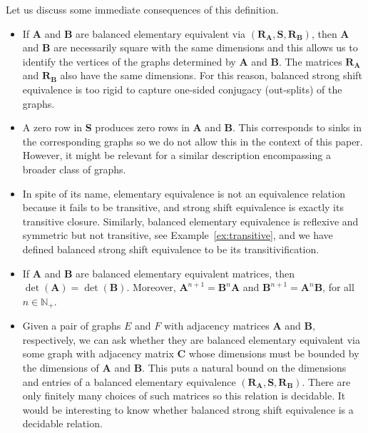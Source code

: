 \documentclass[12pt,a4paper,oneside,reqno,final]{amsart}
\newcommand{\N}{\mathbb{N}}
\theoremstyle{definition}
\numberwithin{equation}{section} %
\begin{document}
Let us discuss some immediate consequences of this definition.
\begin{itemize}
    \item If \textbf{A} and \textbf{B} are balanced elementary equivalent via $(\textbf{R}_\textbf{A}, \textbf{S}, \textbf{R}_\textbf{B})$,
        then \textbf{A} and \textbf{B} are necessarily square with the same dimensions and this allows us to identify the vertices of the graphs determined by \textbf{A} and \textbf{B}.
        The matrices $\textbf{R}_\textbf{A}$ and $\textbf{R}_\textbf{B}$ also have the same dimensions.
        For this reason, balanced strong shift equivalence is too rigid to capture one-sided conjugacy (out-splits) of the graphs.
    \item A zero row in \textbf{S} produces zero rows in \textbf{A} and \textbf{B}. 
        This corresponds to sinks in the corresponding graphs so we do not allow this in the context of this paper.
        However, it might be relevant for a similar description encompassing a broader class of graphs.
    \item In spite of its name, elementary equivalence is not an equivalence relation because it fails to be transitive, and strong shift equivalence is exactly its transitive closure.
        Similarly, balanced elementary equivalence is reflexive and symmetric but not transitive, see Example~\ref{ex:transitive},
        and we have defined balanced strong shift equivalence to be its transitivification.
    \item If \textbf{A} and \textbf{B} are balanced elementary equivalent matrices, then $\det(\textbf{A}) = \det(\textbf{B})$.
        Moreover, $\textbf{A}^{n+1} = \textbf{B}^n \textbf{A}$ and $\textbf{B}^{n+1} = \textbf{A}^n \textbf{B}$, for all $n\in \N_+$.
    \item Given a pair of graphs $E$ and $F$ with adjacency matrices \textbf{A} and \textbf{B}, respectively, we can ask whether they are balanced elementary equivalent
        via some graph with adjacency matrix \textbf{C} whose dimensions must be bounded by the dimensions of \textbf{A} and \textbf{B}.
        This puts a natural bound on the dimensions and entries of a balanced elementary equivalence $(\textbf{R}_\textbf{A}, \textbf{S}, \textbf{R}_\textbf{B})$.
        There are only finitely many choices of such matrices so this relation is decidable. 
        It would be interesting to know whether balanced strong shift equivalence is a decidable relation.
\end{itemize}
\end{document}
